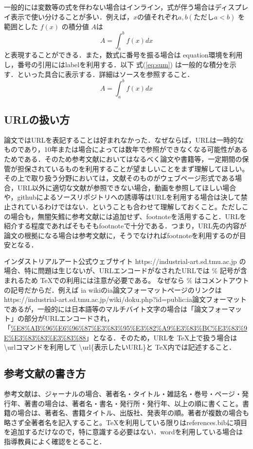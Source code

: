 \documentclass[a4paper,uplatex]{jsarticle}
\begin{document}
一般的には変数等の式を伴わない場合はインライン，式が伴う場合はディスプレイ表示で使い分けることが多い．例えば，$x$の値それぞれ$ a, b(ただしa < b)$ を範囲とした $f(x)$ の積分値 $ A $は
$$
A = \int^{b}_{a} f(x) dx
$$
と表現することができる．また，数式に番号を振る場合は equation環境を利用し，番号の引用にはlabelを利用する．以下 式(\ref{eq:sum}) は一般的な積分を示す．といった具合に表示する．詳細はソースを参照すること．
\begin{equation}
A = \int^{b}_{a} f(x) dx
\label{eq:sum}
\end{equation}

\subsection{URLの扱い方}
論文ではURLを表記することは好まれなかった．なぜならば，URLは一時的なものであり，10年または場合によっては数年で参照ができなくなる可能性があるためである．そのため参考文献においてはなるべく論文や書籍等，一定期間の保管が担保されているものを利用することが望ましいことをまず理解してほしい。その上で取り扱う分野においては，文献そのものがウェブページ形式である場合，URL以外に適切な文献が参照できない場合，動画を参照してほしい場合や，githubによるソースリポジトリへの誘導等はURLを利用する場合は決して禁止されているわけではない．ということも合わせて理解しておくこと。ただしこの場合も，無闇矢鱈に参考文献には追加せず、footnoteを活用すること．URLを紹介する程度であればそもそもfootnoteで十分である．つまり，URL先の内容が論文の根拠になる場合は参考文献に，そうでなければfootnoteを利用するのが目安となる．

インダストリアルアート公式ウェブサイト https://industrial-art.sd.tmu.ac.jp の場合、特に問題は生じないが、URLエンコードがなされたURLでは \% 記号が含まれるため \TeX での利用には注意が必要である。 なぜなら \% はコメントアウトの記号だからだ．例えば ia wikiのia論文フォーマットページのリンクは {https://industrial-art.sd.tmu.ac.jp/wiki/doku.php?id=public:ia論文フォーマット} であるが，一般的には日本語等のマルチバイト文字の場合は「論文フォーマット」の部分がURLエンコードされ，「\url{%E8%AB%96%E6%96%87%E3%83%95%E3%82%A9%E3%83%BC%E3%83%9E%E3%83%83%E3%83%88}」となる．そのため，URLを \TeX 上で扱う場合は \textbackslash{url}コマンドを利用して \textbackslash{url\{表示したいURL\}}と \TeX 内では記述すること．

\subsection{参考文献の書き方}
参考文献は、ジャーナルの場合、著者名・タイトル・雑誌名・巻号・ページ・発行年、著書の場合は、著者名・書名・発行所・発行年、以上の順に書くこと。書籍の場合は、著者名、書籍タイトル、出版社、発表年の順。著者が複数の場合も略さず全著者名を記入すること。\TeX を利用している限りはreferences.bibに項目を追加するだけなので，特に意識する必要はない．wordを利用している場合は指導教員によく確認をとること．
\end{document}
